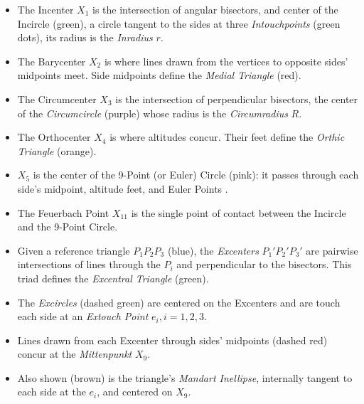 \begin{itemize}
    \item The Incenter $X_1$ is the intersection of angular bisectors, and center of the Incircle (green), a circle tangent to the sides at three {\em Intouchpoints} (green dots), its radius is the {\em Inradius} $r$.
    \item The Barycenter $X_2$ is where lines drawn from the vertices to opposite sides' midpoints meet. Side midpoints define the {\em Medial Triangle} (red).
    \item The Circumcenter $X_3$ is the intersection of perpendicular bisectors, the center of the {\em Circumcircle} (purple) whose radius is the {\em Circumradius} $R$.
    \item The Orthocenter $X_4$ is where altitudes concur. Their feet define the {\em Orthic Triangle} (orange).
    \item $X_5$ is the center of the 9-Point (or Euler) Circle (pink): it passes through each side's midpoint, altitude feet, and Euler Points \cite{mw}.
    \item The Feuerbach Point $X_{11}$ is the single point of contact between the Incircle and the 9-Point Circle.
    \item Given a reference triangle $P_1P_2P_3$ (blue), the {\em Excenters} $P_1'P_2'P_3'$ are pairwise intersections of lines through the $P_i$ and perpendicular to the bisectors. This triad defines the {\em Excentral Triangle} (green).\
    \item The {\em Excircles} (dashed green) are centered on the Excenters and are touch each side at an {\em Extouch Point} $e_i,i=1,2,3$.
    \item Lines drawn from each Excenter through sides' midpoints (dashed red) concur at the {\em Mittenpunkt} $X_9$.
    \item Also shown (brown) is the triangle's {\em Mandart Inellipse}, internally tangent to each side at the $e_i$, and centered on $X_9$.
\end{itemize}

